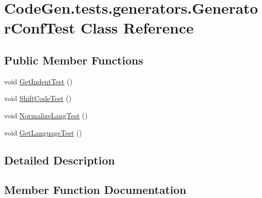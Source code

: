 \hypertarget{classCodeGen_1_1tests_1_1generators_1_1GeneratorConfTest}{}\section{Code\+Gen.\+tests.\+generators.\+Generator\+Conf\+Test Class Reference}
\label{classCodeGen_1_1tests_1_1generators_1_1GeneratorConfTest}


 


\subsection*{Public Member Functions}
\begin{DoxyCompactItemize}
\item 
void \mbox{\hyperlink{classCodeGen_1_1tests_1_1generators_1_1GeneratorConfTest_aa695d2d64351f9cfc01fa9a66cfcc5f0}{Get\+Indent\+Test}} ()
\item 
void \mbox{\hyperlink{classCodeGen_1_1tests_1_1generators_1_1GeneratorConfTest_a3a26863916eed6ddcc04a59873604f66}{Shift\+Code\+Test}} ()
\item 
void \mbox{\hyperlink{classCodeGen_1_1tests_1_1generators_1_1GeneratorConfTest_a20eae51f428fff499711262ea3f96e4d}{Normalize\+Lang\+Test}} ()
\item 
void \mbox{\hyperlink{classCodeGen_1_1tests_1_1generators_1_1GeneratorConfTest_a2b8c73a49a08299aee6cc08ba88ccdc9}{Get\+Language\+Test}} ()
\end{DoxyCompactItemize}


\subsection{Detailed Description}




\subsection{Member Function Documentation}
\mbox{\label{classCodeGen_1_1tests_1_1generators_1_1GeneratorConfTest_aa695d2d64351f9cfc01fa9a66cfcc5f0}} 
